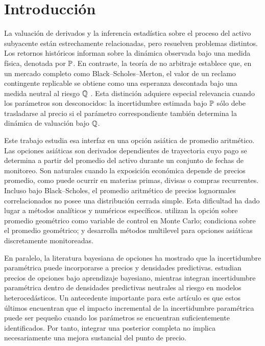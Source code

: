 \section{Introducción}

La valuación de derivados y la inferencia estadística sobre el proceso del activo subyacente están estrechamente relacionadas, pero resuelven problemas distintos. Los retornos históricos informan sobre la dinámica observada bajo una medida física, denotada por $\mathbb{P}$. En contraste, la teoría de no arbitraje establece que, en un mercado completo como Black--Scholes--Merton, el valor de un reclamo contingente replicable se obtiene como una esperanza descontada bajo una medida neutral al riesgo $\mathbb{Q}$ \citep{blackscholes1973,merton1973}. Esta distinción adquiere especial relevancia cuando los parámetros son desconocidos: la incertidumbre estimada bajo $\mathbb{P}$ sólo debe trasladarse al precio si el parámetro correspondiente también determina la dinámica de valuación bajo $\mathbb{Q}$.

Este trabajo estudia esa interfaz en una opción asiática de promedio aritmético. Las opciones asiáticas son derivados dependientes de trayectoria cuyo pago se determina a partir del promedio del activo durante un conjunto de fechas de monitoreo. Son naturales cuando la exposición económica depende de precios promedio, como puede ocurrir en materias primas, divisas o compras recurrentes. Incluso bajo Black--Scholes, el promedio aritmético de precios lognormales correlacionados no posee una distribución cerrada simple. Esta dificultad ha dado lugar a métodos analíticos y numéricos específicos. \citet{kemnavorst1990} utilizan la opción sobre promedio geométrico como variable de control en Monte Carlo; \citet{curran1994} condiciona sobre el promedio geométrico; y \citet{kahale2020} desarrolla métodos multilevel para opciones asiáticas discretamente monitoreadas.

En paralelo, la literatura bayesiana de opciones ha mostrado que la incertidumbre paramétrica puede incorporarse a precios y densidades predictivas. \citet{guidolin2003} estudian precios de opciones bajo aprendizaje bayesiano, mientras \citet{romboutsstentoft2014} integran incertidumbre paramétrica dentro de densidades predictivas neutrales al riesgo en modelos heterocedásticos. Un antecedente importante para este artículo es que estos últimos encuentran que el impacto incremental de la incertidumbre paramétrica puede ser pequeño cuando los parámetros se encuentran suficientemente identificados. Por tanto, integrar una posterior completa no implica necesariamente una mejora sustancial del punto de precio.

